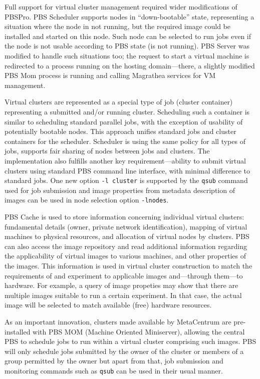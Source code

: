 \documentclass[a4paper]{article}
\begin{document}
Full support for virtual cluster management required wider modifications of PBSPro. 
PBS Scheduler supports nodes in ``down-bootable'' state, representing a situation where the node in not running, but the required 
image could be installed and started on this node. Such node can be selected to run jobs
even if the node is not usable according to PBS state (is not running). PBS Server was modified to handle such situations too; the request to start a virtual machine 
is redirected to a process running on the hosting domain---there, a slightly modified PBS Mom process is running and calling Magrathea services for 
VM management.


Virtual clusters are represented as a special type of job (cluster container) representing a submitted 
and/or running cluster. Scheduling such a container is 
similar to scheduling standard parallel jobs, with the exception of usability of potentially 
bootable nodes.
This approach unifies standard jobs and cluster containers for the scheduler.
Scheduler is using the same 
policy for all types of jobs, supports fair sharing of nodes between jobs and clusters. The implementation 
also fulfills another key requirement---ability to submit virtual clusters using standard PBS command 
line interface, with minimal difference to standard jobs. One new option \texttt{-l cluster} 
is supported by the \texttt{qsub} command used for job submission and image properties from metadata description of images can be used in node selection option 
\texttt{-lnodes}.

PBS Cache is used to store information concerning individual virtual
clusters: fundamental details (owner, private network identification),
mapping of virtual machines to physical resources, and allocation of
virtual nodes by clusters. PBS can also access the image repository and
read additional information regarding the applicability of virtual images
to various machines, and other properties of the images. This information
is used in virtual cluster construction to match the requirements of and
experiment to applicable images and---through them---to hardware. For
example, a query of image propeties may show that there are multiple images
suitable to run a certain experiment. In that case, the actual image will
be selected to match available (free) hardware resources.

As an important innovation, clusters made available by MetaCentrum are pre-installed with PBS MOM (Machine Oriented Miniserver), allowing the central PBS to schedule jobs to run within a virtual cluster comprising such images. PBS will only schedule jobs submitted by the owner of the cluster or members of a group permitted by the owner but apart from that, job submission and monitoring commands such as \texttt{qsub} can be used in their usual manner.
\end{document}
